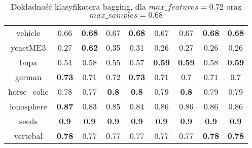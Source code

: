 \begin{table}[H]
\begin{center}
{\begin{tabular}{c|cccccccc}
				vehicle&0.66&\textbf{0.68}&0.67&\textbf{0.68}&0.67&0.67&\textbf{0.68}&\textbf{0.68}\\%

				yeastME3&0.27&\textbf{0.62}&0.35&0.31&0.26&0.27&0.26&0.26\\%

				bupa&0.54&0.58&0.55&0.57&\textbf{0.59}&\textbf{0.59}&0.58&\textbf{0.59}\\%

				german&\textbf{0.73}&0.71&0.72&\textbf{0.73}&0.71&0.7&0.71&0.7\\%

				horse\_colic&0.78&0.77&\textbf{0.8}&\textbf{0.8}&0.79&\textbf{0.8}&0.79&0.79\\%

				ionosphere&\textbf{0.87}&0.83&0.85&0.84&0.86&0.86&0.86&0.86\\%

				seeds&\textbf{0.9}&\textbf{0.9}&\textbf{0.9}&\textbf{0.9}&\textbf{0.9}&\textbf{0.9}&\textbf{0.9}&\textbf{0.9}\\%

				vertebal&\textbf{0.78}&0.77&0.77&0.77&0.77&0.77&\textbf{0.78}&\textbf{0.78}\\%
				\hline%
			\end{tabular}}
			\caption{Dokładność klasyfikatora bagging, dla $max\_features = 0.72$ oraz $max\_samples = 0.68$}
			\label{bagging_acc2}
		\end{center}
	\end{table}
